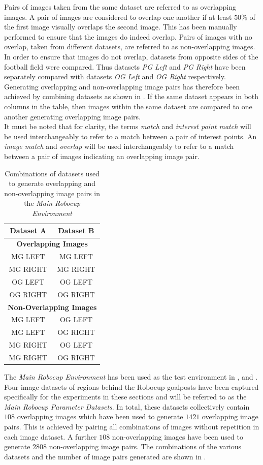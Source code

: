 Pairs of images taken from the same dataset are referred to as overlapping images. A pair of images are considered to overlap one another if at least $50\%$ of the first image visually overlaps the second image. This has been manually performed to ensure that the images do indeed overlap. Pairs of images with no overlap, taken from different datasets, are referred to as non-overlapping images. In order to ensure that images do not overlap, datasets from opposite sides of the football field were compared. Thus datasets \textit{PG Left} and \textit{PG Right} have been separately compared with datasets \textit{OG Left} and \textit{OG Right} respectively. Generating overlapping and non-overlapping image pairs has therefore been achieved by combining datasets as shown in . If the same dataset appears in both columns in the table, then images within the same dataset are compared to one another generating overlapping image pairs. \\

It must be noted that for clarity, the terms \textit{match} and \textit{interest point match} will be used interchangeably to refer to a match between a pair of interest points. An \textit{image match} and \textit{overlap} will be used interchangeably to refer to a match between a pair of images indicating an overlapping image pair.\\

\begin{table}
\centering
\caption{Combinations of datasets used to generate overlapping and non-overlapping image pairs in the \textit{Main Robocup Environment}}
\begin{tabular}{|c|c|}
\hline 
\textbf{Dataset A} & \textbf{Dataset B}\tabularnewline
\hline 
\hline 
\multicolumn{2}{|c|}{\textbf{Overlapping Images}}\tabularnewline
\hline 
MG LEFT & MG LEFT\tabularnewline
\hline 
MG RIGHT & MG RIGHT\tabularnewline
\hline 
OG LEFT & OG LEFT\tabularnewline
\hline 
OG RIGHT & OG RIGHT\tabularnewline
\hline 
\multicolumn{2}{|c|}{\textbf{Non-Overlapping Images}}\tabularnewline
\hline 
MG LEFT & OG LEFT\tabularnewline
\hline 
MG LEFT & OG RIGHT\tabularnewline
\hline 
MG RIGHT & OG LEFT\tabularnewline
\hline 
MG RIGHT & OG RIGHT\tabularnewline
\hline 
\end{tabular}
\label{table:overlap}
\end{table}

The \textit{Main Robocup Environment} has been used as the test environment in ,  and . Four image datasets of regions behind the Robocup goalposts have been captured specifically for the experiments in these sections and will be referred to as the \textit{Main Robocup Parameter Datasets}. In total, these datasets collectively contain $108$ overlapping images which have been used to generate $1421$ overlapping image pairs. This is achieved by pairing all combinations of images without repetition in each image dataset. A further $108$ non-overlapping images have been used to generate $2808$ non-overlapping image pairs. The combinations of the various datasets and the number of image pairs generated are shown in . \\

